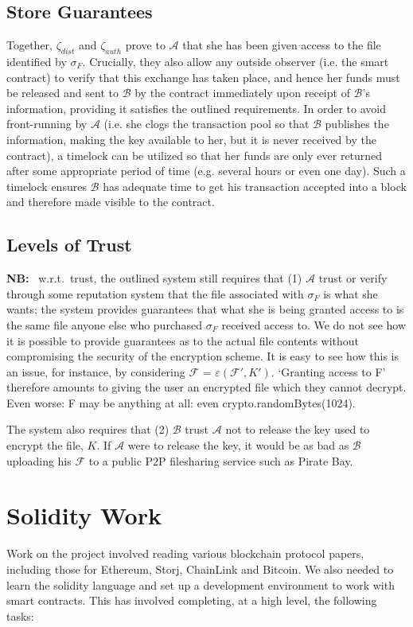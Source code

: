 \documentclass[12pt,oneside]{amsart}
\makeatletter
\def\file{\mathcal{F}}
\def\alice{\mathcal{A}}
\def\bob{\mathcal{B}}
\def\zksnark{\zeta}
\def\encrypt{\varepsilon}
\def\nb{\textbf{NB:} }
\newcommand{\wrt}{\mbox{ w.r.t. }}
\newcommand*\ie{i.e.\@\xspace}
\makeatother
\begin{document}
\begin{multicols}{2}
\subsection{Store Guarantees}

Together, $\zksnark_{dist}$ and $\zksnark_{auth}$ prove to $\alice$ that she has been given access to the file identified by $\sigma_F$.
Crucially, they also allow any outside observer (\ie the smart contract) to verify that this exchange has taken place, and hence her funds must be released and sent to $\bob$ by the contract immediately upon receipt of $\bob$'s information, providing it satisfies the outlined requirements.
In order to avoid front-running by $\alice$ (\ie she clogs the transaction pool so that $\bob$ publishes the information, making the key available to her, but it is never received by the contract), a timelock can be utilized so that her funds are only ever returned after some appropriate period of time (e.g. several hours or even one day).
Such a timelock ensures $\bob$ has adequate time to get his transaction accepted into a block and therefore made visible to the contract.

\subsection{Levels of Trust}

\nb \wrt trust, the outlined system still requires that (1) $\alice$ trust or verify through some reputation system that the file associated with $\sigma_F$ is what she wants; the system provides guarantees that what she is being granted access to is the same file anyone else who purchased $\sigma_F$ received access to.
We do not see how it is possible to provide guarantees as to the actual file contents without compromising the security of the encryption scheme.
It is easy to see how this is an issue, for instance, by considering $\file$ = $\encrypt(\file', K')$.
`Granting access to F' therefore amounts to giving the user an encrypted file which they cannot decrypt.
Even worse: F may be anything at all: even crypto.randomBytes(1024).

The system also requires that (2) $\bob$ trust $\alice$ not to release the key used to encrypt the file, $K$.
If $\alice$ were to release the key, it would be as bad as $\bob$ uploading his $\file$ to a public P2P filesharing service such as Pirate Bay.

\section{Solidity Work} \label{ch:solidity_work}
Work on the project involved reading various blockchain protocol papers, including those for Ethereum, Storj, ChainLink and Bitcoin.
We also needed to learn the solidity language and set up a development environment to work with smart contracts.
This has involved completing, at a high level, the following tasks:


\end{multicols}
\end{document}
